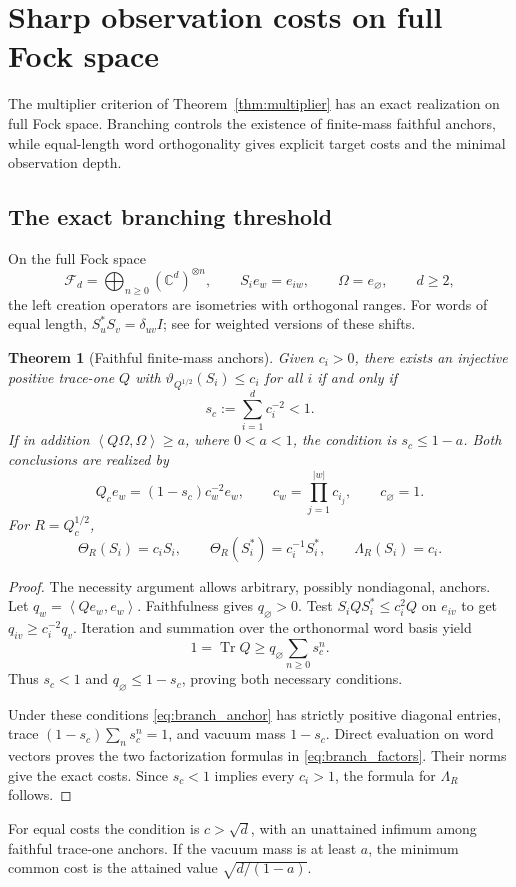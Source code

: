 \documentclass[11pt,a4paper]{amsart}
\numberwithin{equation}{section}
\newtheorem{theorem}{Theorem}[section]
\theoremstyle{definition}
\theoremstyle{remark}
\newcommand{\C}{\mathbb C}
\DeclareMathOperator{\Tr}{Tr}
\newcommand{\ip}[2]{\left\langle#1,#2\right\rangle}
\begin{document}
\appendix
\section{Sharp observation costs on full Fock space}\label{sec:fockcosts}
The multiplier criterion of Theorem~\ref{thm:multiplier} has an exact realization on full Fock space. Branching controls the existence of finite-mass faithful anchors, while equal-length word orthogonality gives explicit target costs and the minimal observation depth.

\subsection{The exact branching threshold}
On the full Fock space
\[
 \mathcal F_d=\bigoplus_{n\ge0}(\C^d)^{\otimes n},\qquad
 S_ie_w=e_{iw},\qquad \Omega=e_\varnothing,\qquad d\ge2,
\]
the left creation operators are isometries with orthogonal ranges. For words of equal length, $S_u^*S_v=\delta_{uv}I$; see \cite{Popescu} for weighted versions of these shifts.

\begin{theorem}[Faithful finite-mass anchors]\label{thm:branch_threshold}
Given $c_i>0$, there exists an injective positive trace-one $Q$ with
$\vartheta_{Q^{1/2}}(S_i)\le c_i$ for all $i$ if and only if
\begin{equation}\label{eq:branch_threshold}
 s_c:=\sum_{i=1}^dc_i^{-2}<1.
\end{equation}
If in addition $\ip{Q\Omega}{\Omega}\ge a$, where $0<a<1$, the condition is $s_c\le1-a$. Both conclusions are realized by
\begin{equation}\label{eq:branch_anchor}
 Q_ce_w=(1-s_c)c_w^{-2}e_w,\qquad
 c_w=\prod_{j=1}^{|w|}c_{i_j},\qquad c_\varnothing=1.
\end{equation}
For $R=Q_c^{1/2}$,
\begin{equation}\label{eq:branch_factors}
 \Theta_R(S_i)=c_iS_i,\qquad
 \Theta_R(S_i^*)=c_i^{-1}S_i^*,\qquad \Lambda_R(S_i)=c_i.
\end{equation}
\end{theorem}
\begin{proof}
The necessity argument allows arbitrary, possibly nondiagonal, anchors. Let $q_w=\ip{Qe_w}{e_w}$. Faithfulness gives $q_\varnothing>0$. Test $S_iQS_i^*\le c_i^2Q$ on $e_{iv}$ to get $q_{iv}\ge c_i^{-2}q_v$. Iteration and summation over the orthonormal word basis yield
\[
 1=\Tr Q\ge q_\varnothing\sum_{n\ge0}s_c^n.
\]
Thus $s_c<1$ and $q_\varnothing\le1-s_c$, proving both necessary conditions.

Under these conditions \eqref{eq:branch_anchor} has strictly positive diagonal entries, trace $(1-s_c)\sum_ns_c^n=1$, and vacuum mass $1-s_c$. Direct evaluation on word vectors proves the two factorization formulas in \eqref{eq:branch_factors}. Their norms give the exact costs. Since $s_c<1$ implies every $c_i>1$, the formula for $\Lambda_R$ follows.
\end{proof}
For equal costs the condition is $c>\sqrt d$, with an unattained infimum among faithful trace-one anchors. If the vacuum mass is at least $a$, the minimum common cost is the attained value $\sqrt{d/(1-a)}$.
\end{document}
